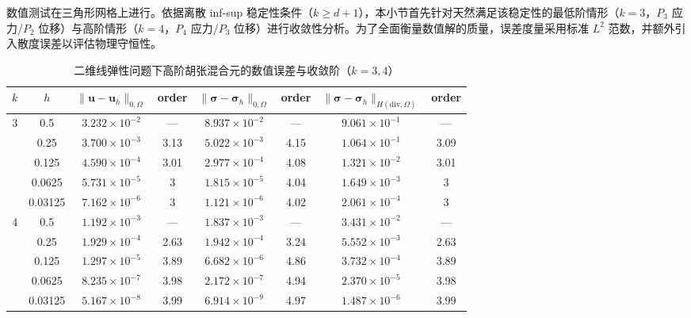 数值测试在三角形网格上进行。依据离散 inf-sup 稳定性条件（$k \ge d+1$），本小节首先针对天然满足该稳定性的最低阶情形（$k=3$，$P_3$ 应力/$P_2$ 位移）与高阶情形（$k=4$，$P_4$ 应力/$P_3$ 位移）进行收敛性分析。为了全面衡量数值解的质量，误差度量采用标准 $L^2$ 范数，并额外引入散度误差以评估物理守恒性。

\begin{table}[htbp]
	\centering
	\caption{二维线弹性问题下高阶胡张混合元的数值误差与收敛阶（$k=3, 4$）}
	\label{tab:ch5_error_analysis_k34}
	\renewcommand{\arraystretch}{1.3} %
	\begin{tabular}{cccccccc}
		\toprule
		$k$ & $h$ & $\|\bm{u} - \bm{u}_h\|_{0,\Omega}$ & order & $\|\bm{\sigma} - \bm{\sigma}_h\|_{0,\Omega}$ & order & $\|\bm{\sigma} - \bm{\sigma}_h\|_{H(\mathrm{div},\Omega)}$ & order \\
		\midrule
		\multirow{5}{*}{3} 
		& 0.5     & $3.232 \times 10^{-2}$ & ---  & $8.937 \times 10^{-2}$ & ---  & $9.061 \times 10^{-1}$ & ---  \\
		& 0.25    & $3.700 \times 10^{-3}$ & 3.13 & $5.022 \times 10^{-3}$ & 4.15 & $1.064 \times 10^{-1}$ & 3.09 \\
		& 0.125   & $4.590 \times 10^{-4}$ & 3.01 & $2.977 \times 10^{-4}$ & 4.08 & $1.321 \times 10^{-2}$ & 3.01 \\
		& 0.0625  & $5.731 \times 10^{-5}$ & 3    & $1.815 \times 10^{-5}$ & 4.04 & $1.649 \times 10^{-3}$ & 3    \\
		& 0.03125 & $7.162 \times 10^{-6}$ & 3    & $1.121 \times 10^{-6}$ & 4.02 & $2.061 \times 10^{-4}$ & 3    \\
		\midrule
		\multirow{5}{*}{4} 
		& 0.5     & $1.192 \times 10^{-3}$ & ---  & $1.837 \times 10^{-3}$ & ---  & $3.431 \times 10^{-2}$ & ---  \\
		& 0.25    & $1.929 \times 10^{-4}$ & 2.63 & $1.942 \times 10^{-4}$ & 3.24 & $5.552 \times 10^{-3}$ & 2.63 \\
		& 0.125   & $1.297 \times 10^{-5}$ & 3.89 & $6.682 \times 10^{-6}$ & 4.86 & $3.732 \times 10^{-4}$ & 3.89 \\
		& 0.0625  & $8.235 \times 10^{-7}$ & 3.98 & $2.172 \times 10^{-7}$ & 4.94 & $2.370 \times 10^{-5}$ & 3.98 \\
		& 0.03125 & $5.167 \times 10^{-8}$ & 3.99 & $6.914 \times 10^{-9}$ & 4.97 & $1.487 \times 10^{-6}$ & 3.99 \\
		\bottomrule
	\end{tabular}
\end{table}

